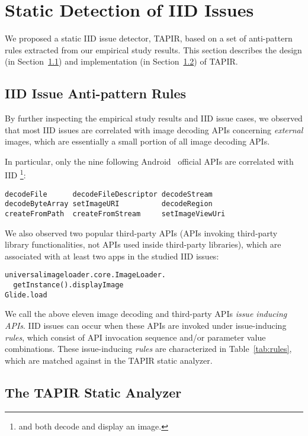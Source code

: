 \section{Static Detection of IID Issues} \label{sec:detection}

We proposed a static IID issue detector, TAPIR, based on a set of anti-pattern rules extracted from our empirical study results.
This section describes the design (in Section~\ref{subsec:tapir-design}) and implementation (in Section~\ref{subsec:tapir-impl}) of TAPIR.

\subsection{IID Issue Anti-pattern Rules} \label{subsec:tapir-design}

By further inspecting the empirical study results and IID issue cases,
we observed that most IID issues are correlated with image decoding APIs concerning \emph{external} images,
which are essentially a small portion of all image decoding APIs.

In particular, only the nine following Android~\cite{Android_API} official APIs are correlated with IID%
\footnote{ and  both decode and display an image.}:

\begin{Verbatim}[fontsize=\footnotesize]
decodeFile      decodeFileDescriptor decodeStream
decodeByteArray setImageURI          decodeRegion
createFromPath  createFromStream     setImageViewUri
\end{Verbatim}

We also observed two popular third-party APIs (APIs invoking third-party library functionalities, not APIs used inside third-party libraries),
which are associated with at least two apps in the studied IID issues:

\begin{Verbatim}[fontsize=\footnotesize]
universalimageloader.core.ImageLoader.
  getInstance().displayImage
Glide.load
\end{Verbatim}
We call the above eleven image decoding and third-party APIs \emph{issue inducing APIs}. IID issues can occur when these APIs are invoked under issue-inducing \emph{rules},
which consist of API invocation sequence and/or parameter value combinations. These issue-inducing \emph{rules} are characterized in Table~\ref{tab:rules},
which are matched against in the TAPIR static analyzer.

\subsection{The TAPIR Static Analyzer} \label{subsec:tapir-impl}

